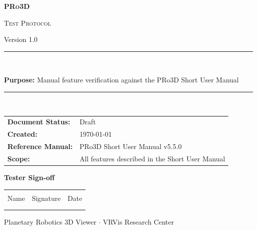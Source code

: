 \documentclass[a4paper,11pt]{article}
\newcommand{\testversion}{1.0}
\begin{document}
	
	\begin{titlepage}
		\centering
		\vspace*{2cm}
		{\scshape\Huge \textcolor{headerblue}{\textbf{PRo3D}} \par}
		\vspace{0.5cm}
		{\scshape\LARGE Test Protocol \par}
		\vspace{0.3cm}
		{\large Version \testversion \par}
		\vspace{2cm}
		\rule{\textwidth}{0.5pt}\\[0.4cm]
		{\large\textbf{Purpose:} Manual feature verification against the PRo3D Short User Manual \par}
		\rule{\textwidth}{0.5pt}\\[1cm]
		
		\begin{tabular}{ll}
			\textbf{Document Status:} & Draft \\[4pt]
			\textbf{Created:}         & \today \\[4pt]
			\textbf{Reference Manual:} & PRo3D Short User Manual v5.5.0 \\[4pt]
			\textbf{Scope:}           & All features described in the Short User Manual \\
		\end{tabular}
		
		\vspace{2cm}
		\textbf{Tester Sign-off}\\[1em]
		\begin{tabular}{p{5cm} p{5cm} p{3cm}}
			\hline\\[-6pt]
			Name & Signature & Date \\[12pt]
			\hline\\
			& & \\[12pt]
			\hline
		\end{tabular}
		
		\vfill
		{\small Planetary Robotics 3D Viewer $\cdot$ VRVis Research Center}
	\end{titlepage}
	
	\newpage
	
\end{document}
